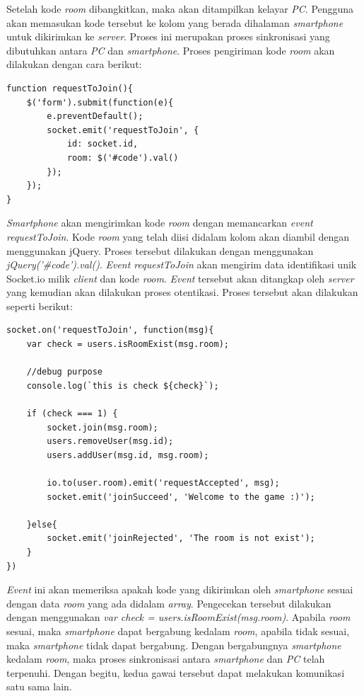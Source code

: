 \begin{enumerate}
\begin{itemize}
		Setelah kode \textit{room} dibangkitkan, maka akan ditampilkan kelayar \textit{PC}. Pengguna akan memasukan kode tersebut ke kolom yang berada dihalaman \textit{smartphone} untuk dikirimkan ke \textit{server}. Proses ini merupakan proses sinkronisasi yang dibutuhkan antara \textit{PC} dan \textit{smartphone}. Proses pengiriman kode \textit{room} akan dilakukan dengan cara berikut:
\begin{lstlisting}[caption={proses permintaan bergabung pada \textit{client}}, label={lst:client_req}, captionpos=b]
function requestToJoin(){
	$('form').submit(function(e){
		e.preventDefault();
		socket.emit('requestToJoin', {
			id: socket.id,
			room: $('#code').val()
		});
	});
}
\end{lstlisting}
		\textit{Smartphone} akan mengirimkan kode \textit{room} dengan memancarkan \textit{event requestToJoin}. Kode \textit{room} yang telah diisi didalam kolom akan diambil dengan menggunakan jQuery. Proses tersebut dilakukan dengan menggunakan \textit{jQuery('\#code').val()}. \textit{Event requestToJoin} akan mengirim data identifikasi unik Socket.io milik \textit{client} dan kode \textit{room}. \textit{Event} tersebut akan ditangkap oleh \textit{server} yang kemudian akan dilakukan proses otentikasi. Proses tersebut akan dilakukan seperti berikut:
\begin{lstlisting}[caption={Proses otentikasi}, label={lst:otentikasi},captionpos=b]
socket.on('requestToJoin', function(msg){
	var check = users.isRoomExist(msg.room);

	//debug purpose
	console.log(`this is check ${check}`);

	if (check === 1) {
		socket.join(msg.room);
		users.removeUser(msg.id);
		users.addUser(msg.id, msg.room);

		io.to(user.room).emit('requestAccepted', msg);
		socket.emit('joinSucceed', 'Welcome to the game :)');

	}else{
		socket.emit('joinRejected', 'The room is not exist');
	}
})
\end{lstlisting}
		\textit{Event} ini akan memeriksa apakah kode yang dikirimkan oleh \textit{smartphone} sesuai dengan data \textit{room} yang ada didalam \textit{array}. Pengecekan tersebut dilakukan dengan menggunakan \textit{var check = users.isRoomExist(msg.room)}. Apabila \textit{room} sesuai, maka \textit{smartphone} dapat bergabung kedalam \textit{room}, apabila tidak sesuai, maka \textit{smartphone} tidak dapat bergabung. Dengan bergabungnya \textit{smartphone} kedalam \textit{room}, maka proses sinkronisasi antara \textit{smartphone} dan \textit{PC} telah terpenuhi. Dengan begitu, kedua gawai tersebut dapat melakukan komunikasi satu sama lain.
		
	\end{itemize}
\end{enumerate}
